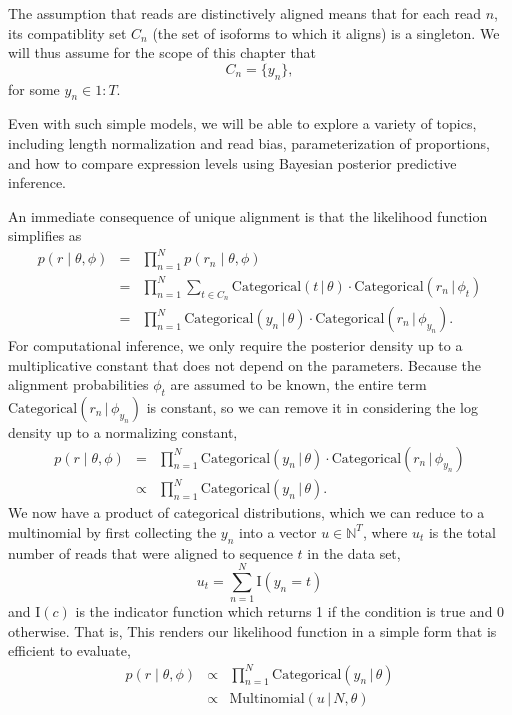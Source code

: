 \documentclass[11pt]{report}
\newcommand{\rngto}[1]{1{:}#1}
\newcommand{\setlist}[1]{\{ #1 \}}
\newcommand{\indicator}[1]{\textrm{I}\!\left( #1 \right)}
\newcommand{\distro}[3]{\textrm{#1}\!\left( #2 \,|\, #3\right)}
\begin{document}
The assumption that reads are distinctively aligned means that for
each read $n$, its compatiblity set $C_n$ (the set of isoforms to
which it aligns) is a singleton.  We will thus assume for the scope of
this chapter that
\[
  C_n = \setlist{y_n},
\]
for some $y_n \in \rngto{T}$.

Even with such simple models, we will be able to explore a variety of
topics, including length normalization and read bias, parameterization
of proportions, and how to compare expression levels using Bayesian
posterior predictive inference.

An immediate consequence of unique alignment is that the likelihood function
simplifies as
\begin{eqnarray*}
  p(r \mid \theta, \phi)
  & = & \textstyle
        \prod_{n=1}^N p(r_n \mid \theta, \phi)
  \\[4pt]
  & = & \textstyle
        \prod_{n=1}^N \sum_{t \in C_n} \distro{Categorical}{t}{\theta}
        \cdot \distro{Categorical}{r_n}{\phi_t}
  \\[4pt]
  & = & \textstyle
        \prod_{n=1}^N \distro{Categorical}{y_n}{\theta}
        \cdot \distro{Categorical}{r_n}{\phi_{y_n}}.
\end{eqnarray*}
%
For computational inference, we only require the posterior density up
to a multiplicative constant that does not depend on the parameters.
Because the alignment probabilities $\phi_t$ are assumed to be
known, the entire term $\distro{Categorical}{r_n}{\phi_{y_n}}$
is constant, so we can remove it in considering the log density up to
a normalizing constant,
%
\begin{eqnarray*}
   p(r \mid \theta, \phi)
  & = & \textstyle
        \prod_{n=1}^N \distro{Categorical}{y_n}{\theta}
        \cdot \distro{Categorical}{r_n}{\phi_{y_n}}
  \\[4pt]
  & \propto & \textstyle
              \prod_{n=1}^N \distro{Categorical}{y_n}{\theta}.
\end{eqnarray*}
%
We now have a product of categorical distributions, which we can
reduce to a multinomial by first collecting the $y_n$ into a vector
$u \in \mathbb{N}^T$, where
$u_t$ is the total number of reads that were aligned to
sequence $t$ in the data set, 
\[
  u_t = \sum_{n=1}^N \indicator{y_n = t}
\]
and $\indicator{c}$ is the indicator function which returns 1 if the
condition is true and 0 otherwise.  That is, This renders our
likelihood function in a simple form that is efficient to evaluate,
\begin{eqnarray*}
   p(r \mid \theta, \phi)
   & \propto & \textstyle
              \prod_{n=1}^N \distro{Categorical}{y_n}{\theta}
  \\[4pt]
              & \propto & \textstyle
  \distro{Multinomial}{u}{N, \theta}
\end{eqnarray*}
\end{document}
